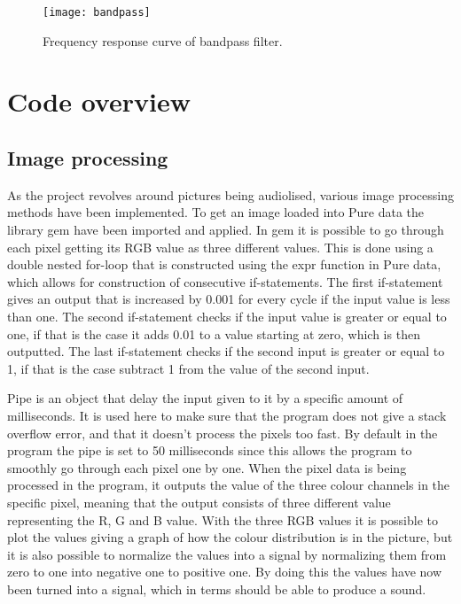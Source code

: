 \begin{figure}
\centering
\texttt{[image: bandpass]}
\caption{Frequency response curve of bandpass filter.}
\label{fig:bandpass}
\end{figure}

\section{Code overview}\label{sec:codeoverview}
	\subsection{Image processing}\label{sub:imageprocessing}
	As the project revolves around pictures being audiolised, various image processing methods have been implemented. To get an image loaded into Pure data the library gem have been imported and applied. In gem it is possible to go through each pixel getting its RGB value as three different values. This is done using a double nested for-loop that is constructed using the expr function in Pure data, which allows for construction of consecutive if-statements. The first if-statement gives an output that is increased by 0.001 for every cycle if the input value is less than one. The second if-statement checks if the input value is greater or equal to one, if that is the case it adds 0.01 to a value starting at zero, which is then outputted. The last if-statement checks if the second input is greater or equal to 1, if that is the case subtract 1 from the value of the second input.
	
	Pipe is an object that delay the input given to it by a specific amount of milliseconds. It is used here to make sure that the program does not give a stack overflow error, and that it doesn't process the pixels too fast. By default in the program the pipe is set to 50 milliseconds since this allows the program to smoothly go through each pixel one by one. 
	When the pixel data is being processed in the program, it outputs the value of the three colour channels in the specific pixel, meaning that the output consists of three different value representing the R, G and B value. With the three RGB values it is possible to plot the values giving a graph of how the colour distribution is in the picture, but it is also possible to normalize the values into a signal by normalizing them from zero to one into negative one to positive one. By doing this the values have now been turned into a signal, which in terms should be able to produce a sound.

